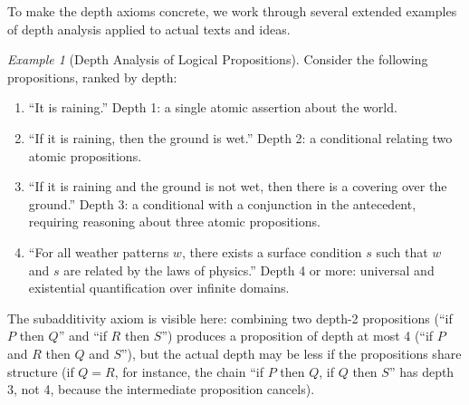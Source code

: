 \documentclass[11pt,openany]{book}
\theoremstyle{definition}
\theoremstyle{plain}
\theoremstyle{remark}
\newtheorem{example}[axiom]{Example}
\begin{document}
To make the depth axioms concrete, we work through several extended examples of depth analysis applied to actual texts and ideas.

\begin{example}[Depth Analysis of Logical Propositions]
Consider the following propositions, ranked by depth:
\begin{enumerate}
\item ``It is raining.'' Depth 1: a single atomic assertion about the world.
\item ``If it is raining, then the ground is wet.'' Depth 2: a conditional relating two atomic propositions.
\item ``If it is raining and the ground is not wet, then there is a covering over the ground.'' Depth 3: a conditional with a conjunction in the antecedent, requiring reasoning about three atomic propositions.
\item ``For all weather patterns $w$, there exists a surface condition $s$ such that $w$ and $s$ are related by the laws of physics.'' Depth 4 or more: universal and existential quantification over infinite domains.
\end{enumerate}

The subadditivity axiom is visible here: combining two depth-2 propositions (``if $P$ then $Q$'' and ``if $R$ then $S$'') produces a proposition of depth at most 4 (``if $P$ and $R$ then $Q$ and $S$''), but the actual depth may be less if the propositions share structure (if $Q = R$, for instance, the chain ``if $P$ then $Q$, if $Q$ then $S$'' has depth 3, not 4, because the intermediate proposition cancels).
\end{example}
\end{document}

